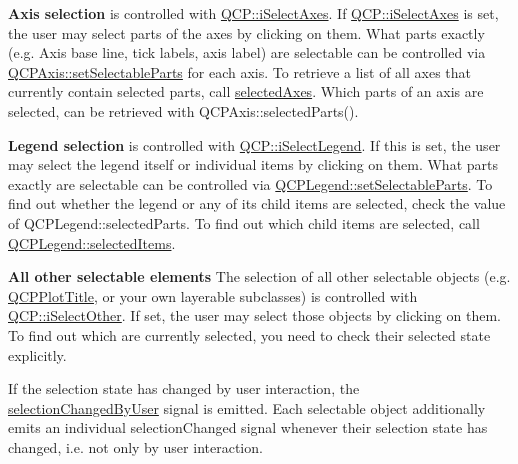 {\bfseries Axis selection} is controlled with \mbox{\hyperlink{namespace_q_c_p_a2ad6bb6281c7c2d593d4277b44c2b037ad6644ac55bef621645326e9dd7469caa}{Q\+C\+P\+::i\+Select\+Axes}}. If \mbox{\hyperlink{namespace_q_c_p_a2ad6bb6281c7c2d593d4277b44c2b037ad6644ac55bef621645326e9dd7469caa}{Q\+C\+P\+::i\+Select\+Axes}} is set, the user may select parts of the axes by clicking on them. What parts exactly (e.\+g. Axis base line, tick labels, axis label) are selectable can be controlled via \mbox{\hyperlink{class_q_c_p_axis_a513f9b9e326c505d9bec54880031b085}{Q\+C\+P\+Axis\+::set\+Selectable\+Parts}} for each axis. To retrieve a list of all axes that currently contain selected parts, call \mbox{\hyperlink{class_q_custom_plot_a7e6b07792b1cb2c31681596582d14dbe}{selected\+Axes}}. Which parts of an axis are selected, can be retrieved with Q\+C\+P\+Axis\+::selected\+Parts().

{\bfseries Legend selection} is controlled with \mbox{\hyperlink{namespace_q_c_p_a2ad6bb6281c7c2d593d4277b44c2b037a269c9af298e257d1108edec0432b5513}{Q\+C\+P\+::i\+Select\+Legend}}. If this is set, the user may select the legend itself or individual items by clicking on them. What parts exactly are selectable can be controlled via \mbox{\hyperlink{class_q_c_p_legend_a9ce60aa8bbd89f62ae4fa83ac6c60110}{Q\+C\+P\+Legend\+::set\+Selectable\+Parts}}. To find out whether the legend or any of its child items are selected, check the value of Q\+C\+P\+Legend\+::selected\+Parts. To find out which child items are selected, call \mbox{\hyperlink{class_q_c_p_legend_ac7d9e567d5c551e09cd9bcc4306c5532}{Q\+C\+P\+Legend\+::selected\+Items}}.

{\bfseries All other selectable elements} The selection of all other selectable objects (e.\+g. \mbox{\hyperlink{class_q_c_p_plot_title}{Q\+C\+P\+Plot\+Title}}, or your own layerable subclasses) is controlled with \mbox{\hyperlink{namespace_q_c_p_a2ad6bb6281c7c2d593d4277b44c2b037af67a50bc26147a13b551b3a625374949}{Q\+C\+P\+::i\+Select\+Other}}. If set, the user may select those objects by clicking on them. To find out which are currently selected, you need to check their selected state explicitly.

If the selection state has changed by user interaction, the \mbox{\hyperlink{class_q_custom_plot_a500c64a109bc773c973ad274f2fa4190}{selection\+Changed\+By\+User}} signal is emitted. Each selectable object additionally emits an individual selection\+Changed signal whenever their selection state has changed, i.\+e. not only by user interaction.

